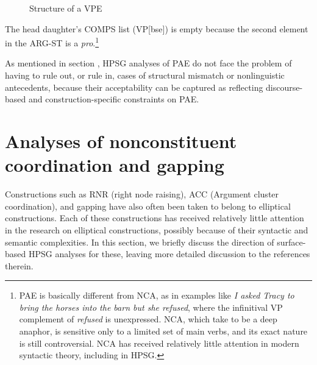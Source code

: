 \documentclass[output=paper
	        ,collection
	        ,collectionchapter
 	        ,biblatex
                ,babelshorthands
                ,newtxmath
                ,draftmode
                ,colorlinks, citecolor=brown
]{langscibook}
\begin{document}
{\begin{figure}
\caption{Structure of a VPE}\label{fig-53}
\end{figure}
%
The head daughter's COMPS list (VP[bse]) is empty because the second element in the ARG-ST
is a \textit{pro}.\footnote{PAE is basically different from NCA, as in examples like \textit{I asked Tracy to bring the horses into the barn but she refused}, where the infinitival VP complement of
\textit{refused} is unexpressed. NCA, which \citet{Hankamer1976} take to be a deep anaphor, is sensitive only to a limited set of main verbs, and its exact nature is still controversial. NCA has received relatively little attention in modern syntactic theory, including in HPSG.}

As mentioned in section \label{sec-structural-mismatches}, HPSG analyses of PAE do not face the problem of having to rule out, or rule in, cases of structural mismatch or nonlinguistic antecedents, because their acceptability can be captured as reflecting discourse-based and construction-specific constraints on PAE.



\section{Analyses of nonconstituent coordination and gapping}
\label{sec-analyses-of-noncon}

Constructions such as
RNR (right node raising), ACC (Argument cluster coordination), and gapping have also often been taken to belong
to elliptical constructions. Each of these constructions has received
relatively little attention in the research on elliptical constructions, possibly
because of their syntactic and semantic complexities. In this
section, we briefly discuss the direction of surface-based HPSG analyses
for these, leaving more detailed discussion
to the references therein.
%
%
%
%

}
\end{document}

